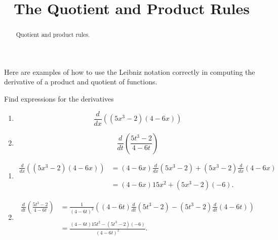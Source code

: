 \documentclass{ximera}
\title{The Quotient and Product Rules}
\begin{document}
\begin{abstract}
Quotient and product rules.
\end{abstract}
\maketitle


Here are examples of how to use the Leibniz notation correctly in computing the derivative of a product and quotient of functions.

\begin{example} \label{Edfhnhhthgg}

Find expressions for the derivatives



\begin{enumerate}

\item 
\[
   \frac{d}{dx} \left( (5x^3-2)(4 - 6x)  \right)
\]

\item 
\[
  \frac{d}{dt} \left( \frac{5t^3-2}{4 - 6t}  \right)
\]
\end{enumerate}

\begin{explanation}
\begin{enumerate}

\item 
\begin{align*}
\frac{d}{dx} \left( (5x^3-2)(4 - 6x)  \right)  &= (4-6x)\frac{d}{dx} \left( 5x^3-2 \right) + (5x^3-2)   \frac{d}{dx} \left( 4-6x \right)    \\ \\
              &= (4-6x) 15x^2+ (5x^3-2) (-6) .
\end{align*}

\item 

\begin{align*}
\frac{d}{dt} \left( \frac{5t^3-2}{4 - 6t}  \right)  &=\frac{1}{(4-6t)^2} \left( (4-6t) \frac{d}{dt} \left( 5t^3-2 \right)  - (5t^3-2)   \frac{d}{dt} \left( 4-6t \right)   \right)  \\ \\
              &= \frac{(4-6t) 15t^2 - (5t^3-2) (-6)}{(4-6t)^2} .
\end{align*}


\end{enumerate}

\end{explanation}

\end{example}
\end{document}
